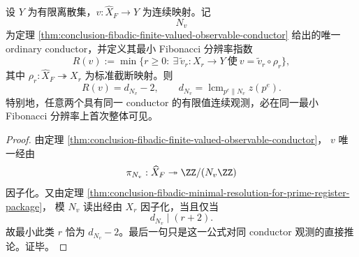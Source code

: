 \begin{theorem}\label{thm:conclusion-fibadic-observable-conductor-depth-transfer}
设 \(Y\) 为有限离散集，\(v:\widehat X_F\to Y\) 为连续映射。记
\[
N_v
\]
为定理
\ref{thm:conclusion-fibadic-finite-valued-observable-conductor}
给出的唯一 ordinary conductor，并定义其最小 Fibonacci 分辨率指数
\[
R(v):=
\min\bigl\{
r\ge 0:\ \exists\,\widetilde v_r:X_r\to Y
\ \text{使}\ v=\widetilde v_r\circ \rho_r
\bigr\},
\]
其中 \(\rho_r:\widehat X_F\twoheadrightarrow X_r\) 为标准截断映射。则
\[
R(v)=d_{N_v}-2,
\qquad
d_{N_v}
=
\operatorname{lcm}_{p^e\parallel N_v} z(p^e).
\]
特别地，任意两个具有同一 conductor 的有限值连续观测，必在同一最小 Fibonacci 分辨率上首次整体可见。
\end{theorem}
\begin{proof}
由定理 \ref{thm:conclusion-fibadic-finite-valued-observable-conductor}，
\(v\) 唯一经由
\[
\pi_{N_v}:\widehat X_F\twoheadrightarrow \ZZ/(N_v\ZZ)
\]
因子化。又由定理
\ref{thm:conclusion-fibadic-minimal-resolution-for-prime-register-package}，
模 \(N_v\) 读出经由 \(X_r\) 因子化，当且仅当
\[
d_{N_v}\mid (r+2).
\]
故最小此类 \(r\) 恰为 \(d_{N_v}-2\)。最后一句只是这一公式对同 conductor 观测的直接推论。证毕。
\end{proof}

